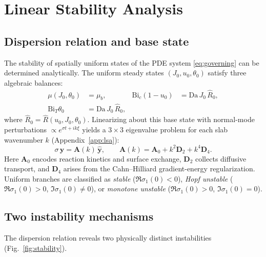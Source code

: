 \documentclass[aps,pre,reprint,superscriptaddress,longbibliography,floatfix]{revtex4-2}
\newcommand{\Da}{\mathrm{Da}}
\newcommand{\Bi}{\mathrm{Bi}}
\newcommand{\Rhat}{\widehat{R}}
\begin{document}
\section{Linear Stability Analysis}
\label{sec:lsa}

\subsection{Dispersion relation and base state}

The stability of spatially uniform states of the PDE system
\eqref{eq:governing} can be determined analytically.  The uniform
steady states $(J_0,u_0,\theta_0)$ satisfy three algebraic balances:
\begin{align}
  \mu(J_0,\theta_0)&=\mu_b, &
  \Bi_c(1-u_0)&=\Da\,J_0\,\Rhat_0, \nonumber\\
  \Bi_T\theta_0&=\Da\,J_0\,\Rhat_0,
  \label{eq:lsa_ss}
\end{align}
where $\Rhat_0=\Rhat(u_0,J_0,\theta_0)$.  Linearizing about this
base state with normal-mode perturbations
$\propto e^{\sigma t+ik\xi}$ yields a $3\times 3$ eigenvalue problem
for each slab wavenumber $k$ (Appendix~\ref{app:lsa}):
\begin{equation}
  \sigma\,\widehat{\mathbf y} = \mathbf A(k)\,\widehat{\mathbf y},
  \qquad
  \mathbf A(k)=\mathbf A_0 + k^2\mathbf D_2 + k^4\mathbf D_4.
  \label{eq:dispersion_matrix}
\end{equation}
Here $\mathbf A_0$ encodes reaction kinetics and surface exchange,
$\mathbf D_2$ collects diffusive transport, and $\mathbf D_4$ arises
from the Cahn--Hilliard gradient-energy regularization.  Uniform
branches are classified as \emph{stable}
($\Re\sigma_1(0)<0$), \emph{Hopf unstable}
($\Re\sigma_1(0)>0$, $\Im\sigma_1(0)\neq 0$), or
\emph{monotone unstable} ($\Re\sigma_1(0)>0$,
$\Im\sigma_1(0)=0$).

\subsection{Two instability mechanisms}

The dispersion relation reveals two physically distinct instabilities
(Fig.~\ref{fig:stability}).
\end{document}
